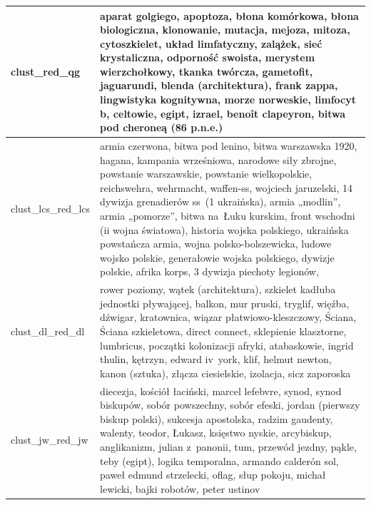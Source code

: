 \documentclass{praca1}
\begin{document}
\begin{longtable}{|L{0.5cm}|L{15cm}|}
   \hline
\begin{sideways}clust\_red\_qg\end{sideways} & aparat golgiego, apoptoza, błona komórkowa, błona biologiczna, klonowanie, mutacja, mejoza, mitoza, cytoszkielet, układ limfatyczny, zalążek, sieć krystaliczna, odporność swoista, merystem wierzchołkowy, tkanka twórcza, gametofit, jaguarundi, blenda (architektura), frank zappa, lingwistyka kognitywna, morze norweskie, limfocyt b, celtowie, egipt, izrael, benoît clapeyron, bitwa pod cheroneą (86 p.n.e.) \\ %
   \hline
\begin{sideways}clust\_lcs\_red\_lcs\end{sideways} & armia czerwona, bitwa pod lenino, bitwa warszawska 1920, hagana, kampania wrześniowa, narodowe siły zbrojne, powstanie warszawskie, powstanie wielkopolskie, reichswehra, wehrmacht, waffen-ss, wojciech jaruzelski, 14 dywizja grenadierów ss~(1 ukraińska), armia „modlin”, armia „pomorze”, bitwa na~Łuku kurskim, front wschodni (ii wojna światowa), historia wojska polskiego, ukraińska powstańcza armia, wojna polsko-bolszewicka, ludowe wojsko polskie, generałowie wojska polskiego, dywizje polskie, afrika korps, 3 dywizja piechoty legionów, \\ %
   \hline
\begin{sideways}clust\_dl\_red\_dl\end{sideways} & rower poziomy, wątek (architektura), szkielet kadłuba jednostki pływającej, balkon, mur pruski, tryglif, więźba, dźwigar, kratownica, wiązar płatwiowo-kleszczowy, Ściana, Ściana szkieletowa, direct connect, sklepienie klasztorne, lumbricus, początki kolonizacji afryki, atabaskowie, ingrid thulin, kętrzyn, edward iv~york, klif, helmut newton, kanon (sztuka), złącza ciesielskie, izolacja, sicz zaporoska \\ %
   \hline
\begin{sideways}clust\_jw\_red\_jw\end{sideways} & diecezja, kościół łaciński, marcel lefebvre, synod, synod biskupów, sobór powszechny, sobór efeski, jordan (pierwszy biskup polski), sukcesja apostolska, radzim gaudenty, walenty, teodor, Łukasz, księstwo nyskie, arcybiskup, anglikanizm, julian z~panonii, tum, przewód jezdny, pąkle, teby (egipt), logika temporalna, armando calderón sol, paweł edmund strzelecki, oflag, słup pokoju, michał lewicki, bajki robotów, peter ustinov \\ %

\end{longtable}
\end{document}

